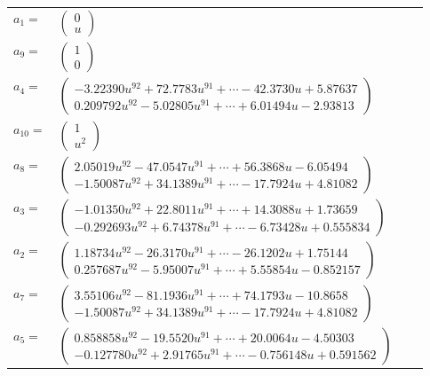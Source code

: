 \documentclass[1p]{elsarticle_modified}
\theoremstyle{definition}
\begin{document}
\begin{tabular}{m{7pt} m{180pt} m{7pt} m{180pt} }
\flushright $a_{1}=$&$\begin{pmatrix}0\\u\end{pmatrix}$ \\
\flushright $a_{9}=$&$\begin{pmatrix}1\\0\end{pmatrix}$ \\
\flushright $a_{4}=$&$\begin{pmatrix}-3.22390 u^{92}+72.7783 u^{91}+\cdots-42.3730 u+5.87637\\0.209792 u^{92}-5.02805 u^{91}+\cdots+6.01494 u-2.93813\end{pmatrix}$ \\
\flushright $a_{10}=$&$\begin{pmatrix}1\\u^2\end{pmatrix}$ \\
\flushright $a_{8}=$&$\begin{pmatrix}2.05019 u^{92}-47.0547 u^{91}+\cdots+56.3868 u-6.05494\\-1.50087 u^{92}+34.1389 u^{91}+\cdots-17.7924 u+4.81082\end{pmatrix}$ \\
\flushright $a_{3}=$&$\begin{pmatrix}-1.01350 u^{92}+22.8011 u^{91}+\cdots+14.3088 u+1.73659\\-0.292693 u^{92}+6.74378 u^{91}+\cdots-6.73428 u+0.555834\end{pmatrix}$ \\
\flushright $a_{2}=$&$\begin{pmatrix}1.18734 u^{92}-26.3170 u^{91}+\cdots-26.1202 u+1.75144\\0.257687 u^{92}-5.95007 u^{91}+\cdots+5.55854 u-0.852157\end{pmatrix}$ \\
\flushright $a_{7}=$&$\begin{pmatrix}3.55106 u^{92}-81.1936 u^{91}+\cdots+74.1793 u-10.8658\\-1.50087 u^{92}+34.1389 u^{91}+\cdots-17.7924 u+4.81082\end{pmatrix}$ \\
\flushright $a_{5}=$&$\begin{pmatrix}0.858858 u^{92}-19.5520 u^{91}+\cdots+20.0064 u-4.50303\\-0.127780 u^{92}+2.91765 u^{91}+\cdots-0.756148 u+0.591562\end{pmatrix}$ \\

\end{tabular}
\end{document}
